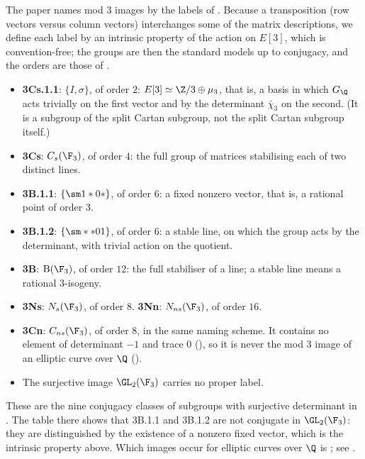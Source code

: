 \begin{example}[Sutherland's labels at $\ell=3$]\label{ex:groups:sutherland3}
The paper names mod $3$ images by the labels of \cite{Sutherland16}. Because a transposition (row vectors versus column vectors) interchanges some of the
matrix descriptions, we define each label by an intrinsic property of the action on $E[3]$, which is convention-free; the groups are then the standard models
up to conjugacy, and the orders are those of .
\begin{itemize}
\item \textbf{3Cs.1.1}: $\{I,\sigma\}$, of order $2$: $E[3]\simeq\Z/3\oplus\mu_3$, that is, a basis in which $G_\Q$ acts trivially on the first vector and by the
determinant $\bar\chi_3$ on the second. (It is a subgroup of the split Cartan subgroup, not the split Cartan subgroup itself.)
\item \textbf{3Cs}: $C_s(\F_3)$, of order $4$: the full group of matrices stabilising each of two distinct lines.
\item \textbf{3B.1.1}: $\{\sm1*0*\}$, of order $6$: a fixed nonzero vector, that is, a rational point of order $3$.
\item \textbf{3B.1.2}: $\{\sm**01\}$, of order $6$: a stable line, on which the group acts by the determinant, with trivial action on the quotient.
\item \textbf{3B}: $\mathrm B(\F_3)$, of order $12$: the full stabiliser of a line; a stable line means a rational $3$-isogeny.
\item \textbf{3Ns}: $N_s(\F_3)$, of order $8$. \textbf{3Nn}: $N_{ns}(\F_3)$, of order $16$.
\item \textbf{3Cn}: $C_{ns}(\F_3)$, of order $8$, in the same naming scheme. It contains no element of determinant $-1$ and trace $0$ (), so it is
never the mod $3$ image of an elliptic curve over $\Q$ ().
\item The surjective image $\GL_2(\F_3)$ carries no proper label.
\end{itemize}
These are the nine conjugacy classes of subgroups with surjective determinant in . The table there shows that 3B.1.1 and 3B.1.2 are not
conjugate in $\GL_2(\F_3)$: they are distinguished by the existence of a nonzero fixed vector, which is the intrinsic property above. Which images occur for
elliptic curves over $\Q$ is \cite{Zywina15}; see .
\end{example}

